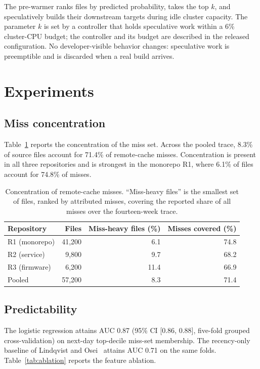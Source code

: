 \documentclass{anvil-paper}
\begin{document}
The pre-warmer ranks files by predicted probability, takes the top $k$, and
speculatively builds their downstream targets during idle cluster capacity.
The parameter $k$ is set by a controller that holds speculative work within a
6\% cluster-CPU budget; the controller and its budget are described in the
released configuration. No developer-visible behavior changes: speculative
work is preemptible and is discarded when a real build arrives.

\section{Experiments}
\label{sec:experiments}

\subsection{Miss concentration}

Table~\ref{tab:concentration} reports the concentration of the miss set. Across
the pooled trace, 8.3\% of source files account for 71.4\% of remote-cache
misses. Concentration is present in all three repositories and is strongest in
the monorepo R1, where 6.1\% of files account for 74.8\% of misses.

\begin{table}[t]
  \centering
  \begin{tabular}{lrrr}
    \toprule
    Repository & Files & Miss-heavy files (\%) & Misses covered (\%) \\
    \midrule
    R1 (monorepo)  & 41{,}200 & 6.1 & 74.8 \\
    R2 (service)   & 9{,}800  & 9.7 & 68.2 \\
    R3 (firmware)  & 6{,}200  & 11.4 & 66.9 \\
    \midrule
    Pooled         & 57{,}200 & 8.3 & 71.4 \\
    \bottomrule
  \end{tabular}
  \caption{Concentration of remote-cache misses. ``Miss-heavy files'' is the
  smallest set of files, ranked by attributed misses, covering the reported
  share of all misses over the fourteen-week trace.}
  \label{tab:concentration}
\end{table}

\subsection{Predictability}

The logistic regression attains AUC 0.87 (95\% CI [0.86, 0.88], five-fold
grouped cross-validation) on next-day top-decile miss-set membership. The
recency-only baseline of Lindqvist and Osei~\cite{lindqvist2021prefetch}
attains AUC 0.71 on the same folds. Table~\ref{tab:ablation} reports the
feature ablation.
\end{document}

